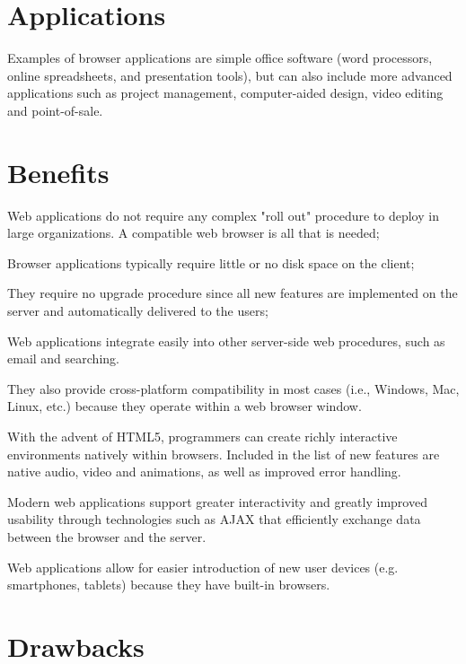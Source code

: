 \section{Applications}


Examples of browser applications are simple office software (word processors, online spreadsheets, and presentation tools), but can also include more advanced applications such as project management, computer-aided design, video editing and point-of-sale.






\section{Benefits}

\begin{compactitem}
\item Web applications do not require any complex "roll out" procedure to deploy in large organizations. A compatible web browser is all that is needed;
\item Browser applications typically require little or no disk space on the client;
\item They require no upgrade procedure since all new features are implemented on the server and automatically delivered to the users;
\item Web applications integrate easily into other server-side web procedures, such as email and searching.
\item They also provide cross-platform compatibility in most cases (i.e., Windows, Mac, Linux, etc.) because they operate within a web browser window.
\item With the advent of HTML5, programmers can create richly interactive environments natively within browsers. Included in the list of new features are native audio, video and animations, as well as improved error handling.
\item Modern web applications support greater interactivity and greatly improved usability through technologies such as AJAX that efficiently exchange data between the browser and the server.
\item Web applications allow for easier introduction of new user devices (e.g. smartphones, tablets) because they have built-in browsers.
\end{compactitem}




\section{Drawbacks}

